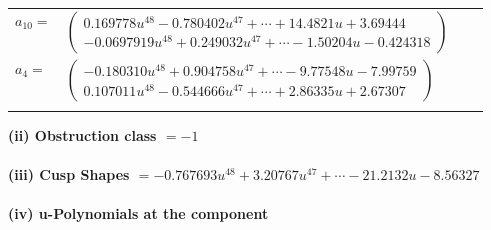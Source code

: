 \documentclass[1p]{elsarticle_modified}
\theoremstyle{definition}
\begin{document}
\begin{tabular}{m{7pt} m{180pt} m{7pt} m{180pt} }
\flushright $a_{10}=$&$\begin{pmatrix}0.169778 u^{48}-0.780402 u^{47}+\cdots+14.4821 u+3.69444\\-0.0697919 u^{48}+0.249032 u^{47}+\cdots-1.50204 u-0.424318\end{pmatrix}$ \\
\flushright $a_{4}=$&$\begin{pmatrix}-0.180310 u^{48}+0.904758 u^{47}+\cdots-9.77548 u-7.99759\\0.107011 u^{48}-0.544666 u^{47}+\cdots+2.86335 u+2.67307\end{pmatrix}$\\&\end{tabular}
\flushleft \textbf{(ii) Obstruction class $= -1$}\\~\\
\flushleft \textbf{(iii) Cusp Shapes $= -0.767693 u^{48}+3.20767 u^{47}+\cdots-21.2132 u-8.56327$}\\~\\
\newpage\renewcommand{\arraystretch}{1}
\flushleft \textbf{(iv) u-Polynomials at the component}\newline \\
\end{document}
